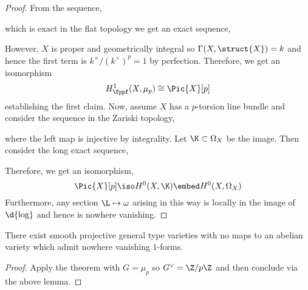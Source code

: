\documentclass[12pt]{article}
\begin{document}
\begin{proof}
From the sequence,
\begin{center}
\end{center}
which is exact in the flat topology we get an exact sequence,
\begin{center}
\end{center}
However, $X$ is proper and geometrically integral so $\Gamma(X, \struct{X}) = k$ and hence the first term is $k^\times / (k^\times)^p = 1$ by perfection. Therefore, we get an isomorphism
\[ H^1_{\fppf}(X, \mu_p) \cong \Pic{X}[p] \]
establishing the first claim. Now, assume $X$ has a $p$-torsion line bundle and consider the sequence in the Zariski topology,
\begin{center}
\end{center}
where the left map is injective by integrality. Let $\K \subset \Omega_X$ be the image. Then consider the long exact sequence,
\begin{center}
\end{center}
Therefore, we get an isomorphism,
\[ \Pic{X}[p] \iso H^0(X, \K) \embed H^0(X, \Omega_X) \]
Furthermore, any section $\L \mapsto \omega$ arising in this way is locally in the image of $\d{\log}$ and hence is nowhere vanishing.
\end{proof}

\begin{cor}
There exist smooth projective general type varieties with no maps to an abelian variety which admit nowhere vanishing $1$-forms. 
\end{cor}

\begin{proof}
Apply the theorem with $G = \mu_p$ so $G^\vee = \Z / p \Z$ and then conclude via the above lemma.
\end{proof}
\end{document}
